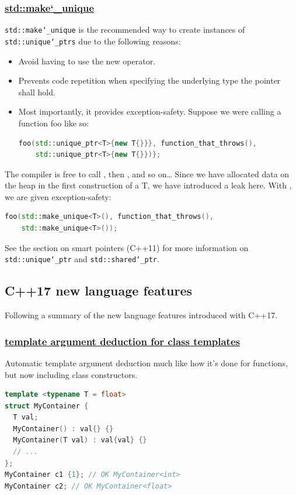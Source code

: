 \subsubsection{\href{https://github.com/AnthonyCalandra/modern-cpp-features/tree/master\#stdmake_unique}
                    {std::make\char`_unique}}
\label{sec:std-make-unique}
\texttt{std::make\char`_unique} is the recommended way to create instances 
of \texttt{std::unique\char`_ptrs} due to the following reasons:
\begin{itemize}
    \item Avoid having to use the new operator.
    \item Prevents code repetition when specifying the underlying type 
          the pointer shall hold.
    \item Most importantly, it provides exception-safety. Suppose we were 
          calling a function foo like so:
\begin{lstlisting}[language=C++]
foo(std::unique_ptr<T>{new T{}}}, function_that_throws(), 
    std::unique_ptr<T>{new T{}})};
\end{lstlisting}
\end{itemize}

The compiler is free to call , then , 
and so on\dots{}
\newline
Since we have allocated data on the heap in the first 
construction of a T, we have introduced a leak here. 
With , we are given exception-safety:

\begin{lstlisting}[language=C++]
foo(std::make_unique<T>(), function_that_throws(),
    std::make_unique<T>());
\end{lstlisting}
See the section on smart pointers (C++11) for more information on 
\texttt{std::unique\char`_ptr} and \texttt{std::shared\char`_ptr}.

\subsection{C++17 new language features}
Following a summary of the new language features introduced with C++17.
\subsubsection{\href{https://github.com/AnthonyCalandra/modern-cpp-features/tree/master\#template-argument-deduction-for-class-templates}
                    {template argument deduction for class templates}}
Automatic template argument deduction much like how it's done for functions, 
but now including class constructors.
\begin{lstlisting}[language=C++]
template <typename T = float>
struct MyContainer {
  T val;
  MyContainer() : val{} {}
  MyContainer(T val) : val{val} {}
  // ...
};
MyContainer c1 {1}; // OK MyContainer<int>
MyContainer c2; // OK MyContainer<float>
\end{lstlisting}

